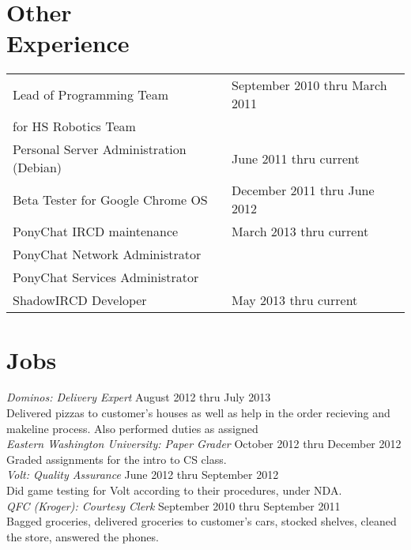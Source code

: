 \documentclass[line, margin]{res}
\begin{document}
\begin{resume}
\section{Other \\ Experience}
\begin{tabular}{l l}
 Lead of Programming Team & \hfill September 2010 thru March 2011 \\ 
 for HS Robotics Team & \\ [6pt]
 Personal Server Administration (Debian) & \hfill June 2011 thru current  \\ [6pt]
 Beta Tester for Google Chrome OS & \hfill December 2011 thru June 2012 \\ [6pt]
 PonyChat IRCD maintenance & \hfill March 2013 thru current \\ 
 PonyChat Network Administrator & \hfill \\ 
 PonyChat Services Administrator & \hfill \\ [6pt]
 ShadowIRCD Developer & \hfill May 2013 thru current \\
\end{tabular}

\section{Jobs}
\textit{Dominos: Delivery Expert} \hfill August 2012 thru July 2013 \\
Delivered pizzas to customer's houses as well as help in the order
recieving and makeline process. Also performed duties as assigned \\ [6pt]
\textit{Eastern Washington University: Paper Grader} \hfill October 2012 thru December 2012 \\
Graded assignments for the intro to CS class. \\ [6pt]
\textit{Volt: Quality Assurance} \hfill June 2012 thru September 2012 \\
Did game testing for Volt according to their procedures, under NDA. \\ [6pt]
\textit{QFC (Kroger): Courtesy Clerk} \hfill September 2010 thru September 2011 \\
Bagged groceries, delivered groceries to customer's cars, stocked
shelves, cleaned the store, answered the phones. \\ [6pt]
     
\end{resume}
\end{document}
